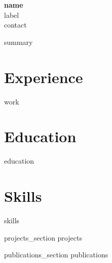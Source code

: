 \documentclass[10pt,a4paper]{article}
\begin{document}
\begin{center}
  {\LARGE\bfseries {{ name }}}\\[0.25em]
  {\large {{ label }}}\\[0.4em]
  {{ contact }}
\end{center}

\vspace{0.4em}

{{ summary }}

\section{Experience}
{{ work }}

\section{Education}
{{ education }}

\section{Skills}
{{ skills }}

{{ projects_section }}
{{ projects }}

{{ publications_section }}
{{ publications }}
\end{document}
